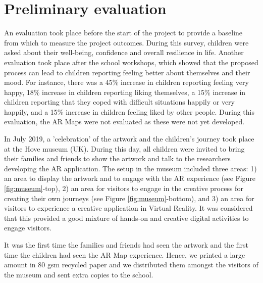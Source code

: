 \documentclass[acmlarge,screen,dvipsnames]{acmart}
\begin{document}
\section{Preliminary evaluation} \label{eval} An evaluation took place before
the start of the project to provide a baseline from which to measure the
project outcomes. During this survey, children were asked about their
well-being, confidence and overall resilience in life. Another evaluation took
place after the school workshops, which showed that the proposed process can
lead to children reporting feeling better about themselves and their mood. For
instance, there was a 45\% increase in children reporting feeling very happy,
18\% increase in children reporting liking themselves, a 15\% increase in
children reporting that they coped with difficult situations happily or very
happily, and a 15\% increase in children feeling liked by other people. During
this evaluation, the AR Maps were not evaluated as these were not yet
developed.

In July 2019, a 'celebration' of the artwork and the children's journey took
place at the Hove museum (UK). During this day, all children were invited to
bring their families and friends to show the artwork and talk to the
researchers developing the AR application. The setup in the museum included
three areas: 1) an area to display the artwork and to engage with the AR
experience (see Figure \ref{fig:museum}-top), 2) an area for visitors to
engage in the creative process for creating their own journeys (see Figure
\ref{fig:museum}-bottom), and 3) an area for visitors to experience a creative
application in Virtual Reality. It was considered that this provided a good mixture
of hands-on and creative digital activities to engage visitors.

It was the first time the families and friends had seen the artwork and the
first time the children had seen the AR Map experience. Hence, we printed a
large amount in 80 gsm recycled paper and we distributed them amongst the
visitors of the museum and sent extra copies to the school.
\end{document}
